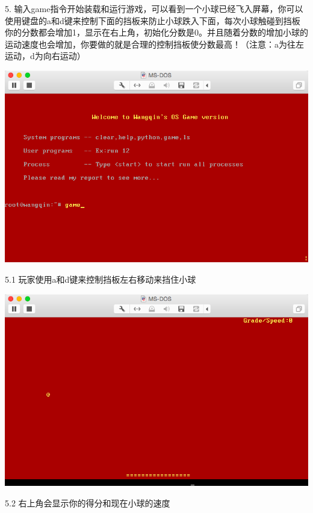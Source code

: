 \documentclass[a4paper]{article}
\begin{document}
{5. 输入game指令开始装载和运行游戏，可以看到一个小球已经飞入屏幕，你可以使用键盘的a和d键来控制下面的挡板来防止小球跌入下面，每次小球触碰到挡板你的分数都会增加1，显示在右上角，初始化分数是0。并且随着分数的增加小球的运动速度也会增加，你要做的就是合理的控制挡板使分数最高！{\scriptsize （注意：a为往左运动，d为向右运动）} 
  \begin{center} \includegraphics[scale=0.5]{Illustrations/start.png} \end{center}
5.1 玩家使用a和d键来控制挡板左右移动来挡住小球\\
  \begin{center} \includegraphics[scale=0.5]{Illustrations/gaming0.png} \end{center}
5.2 右上角会显示你的得分和现在小球的速度\\
}
\end{document}
